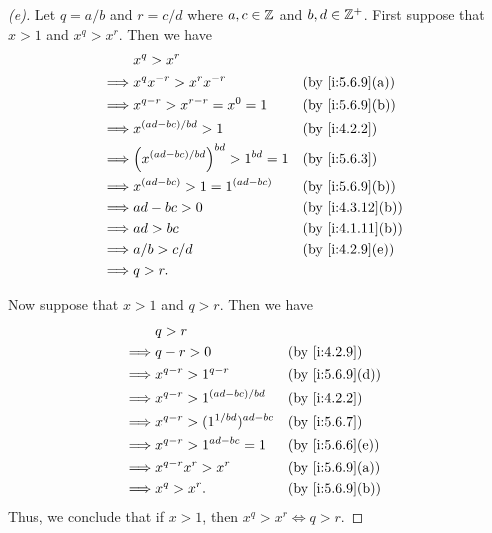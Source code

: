 \begin{proof}[(e)]
  Let \(q = a / b\) and \(r = c / d\) where \(a, c \in \mathbb{Z}\) and \(b, d \in \mathbb{Z}^+\).
  First suppose that \(x > 1\) and \(x^q > x^r\).
  Then we have
  \begin{align*}
             & x^q > x^r                                                       \\
    \implies & x^q x^{-r} > x^r x^{-r}                   &  & \by{i:5.6.9}[a]  \\
    \implies & x^{q - r} > x^{r - r} = x^0 = 1           &  & \by{i:5.6.9}[b]  \\
    \implies & x^{(ad - bc) / bd} > 1                    &  & \by{i:4.2.2}     \\
    \implies & \pa{x^{(ad - bc) / bd}}^{bd} > 1^{bd} = 1 &  & \by{i:5.6.3}     \\
    \implies & x^{(ad - bc)} > 1 = 1^{(ad - bc)}         &  & \by{i:5.6.9}[b]  \\
    \implies & ad - bc > 0                               &  & \by{i:4.3.12}[b] \\
    \implies & ad > bc                                   &  & \by{i:4.1.11}[b] \\
    \implies & a / b > c / d                             &  & \by{i:4.2.9}[e]  \\
    \implies & q > r.
  \end{align*}

  Now suppose that \(x > 1\) and \(q > r\).
  Then we have
  \begin{align*}
             & q > r                                                   \\
    \implies & q - r > 0                          &  & \by{i:4.2.9}    \\
    \implies & x^{q - r} > 1^{q - r}              &  & \by{i:5.6.9}[d] \\
    \implies & x^{q - r} > 1^{(ad - bc) / bd}     &  & \by{i:4.2.2}    \\
    \implies & x^{q - r} > (1^{1 / bd})^{ad - bc} &  & \by{i:5.6.7}    \\
    \implies & x^{q - r} > 1^{ad - bc} = 1        &  & \by{i:5.6.6}[e] \\
    \implies & x^{q - r} x^r > x^r                &  & \by{i:5.6.9}[a] \\
    \implies & x^q > x^r.                         &  & \by{i:5.6.9}[b]
  \end{align*}
  Thus, we conclude that if \(x > 1\), then \(x^q > x^r \iff q > r\).


\end{proof}
